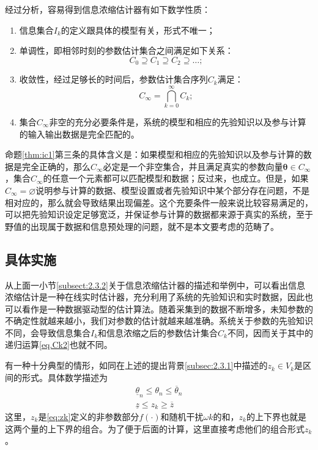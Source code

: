 \begin{prop}%
\label{thm:ic1}
经过分析，容易得到信息浓缩估计器有如下数学性质：
\begin{enumerate}
\item 信息集合$I_{k}$的定义跟具体的模型有关，形式不唯一；
\item 单调性，即相邻时刻的参数估计集合之间满足如下关系：
\begin{equation}%
C_{0}\supseteq C_{1}\supseteq C_{2}\supseteq\ldots;
\end{equation}
\item 收敛性，经过足够长的时间后，参数估计集合序列$C_{k}$满足：
\begin{equation}%
C_{\infty} = \bigcap_{k=0}^{\infty}C_{k};
\end{equation}
\item 集合$C_{\infty}$非空的充分必要条件是，系统的模型和相应的先验知识以及参与计算的输入输出数据是完全匹配的。
\end{enumerate}
\end{prop}

命题\ref{thm:ic1}第三条的具体含义是：如果模型和相应的先验知识以及参与计算的数据是完全正确的，那么$C_{\infty}$必定是一个非空集合，并且满足真实的参数向量$\bm{\theta}\in C_{\infty}$，集合$C_{\infty}$的任意一个元素都可以匹配模型和数据；反过来，也成立。但是，如果$C_{\infty}=\varnothing$说明参与计算的数据、模型设置或者先验知识中某个部分存在问题，不是相对应的，那么就会导致结果出现偏差。这个充要条件一般来说比较容易满足的，可以把先验知识设定足够宽泛，并保证参与计算的数据都来源于真实的系统，至于野值的出现属于数据和信息预处理的问题，就不是本文要考虑的范畴了。
\subsection{具体实施}\label{subsect:2.3.3}
从上面一小节\ref{subsect:2.3.2}关于信息浓缩估计器的描述和举例中，可以看出信息浓缩估计是一种在线实时估计器，充分利用了系统的先验知识和实时数据，因此也可以看作是一种数据驱动型的估计算法。随着采集到的数据不断增多，未知参数的不确定性就越来越小，我们对参数的估计就越来越准确。系统关于参数的先验知识不同，会导致信息集合$I_{k}$和信息浓缩之后的参数估计集合$C_{k}$不同，因而关于其中的递归运算\eqref{eq.Ck2}也就不同。

有一种十分典型的情形，如同在上述的提出背景\ref{subsec:2.3.1}中描述的$z_{k}\in V_{k}$是区间的形式。具体数学描述为
\begin{eqnarray}%
\underline{\theta}_{n}\leq\theta_{n}\leq\overline{\theta}_{n}\\
\underline{z}\leq z_{k}\geq\overline{z}
\end{eqnarray}
这里，$z_{k}$是\eqref{eq:zk}定义的非参数部分$f(\cdot)$和随机干扰$\omega{k}$的和，$z_{k}$的上下界也就是这两个量的上下界的组合。为了便于后面的计算，这里直接考虑他们的组合形式$z_{k}$。

